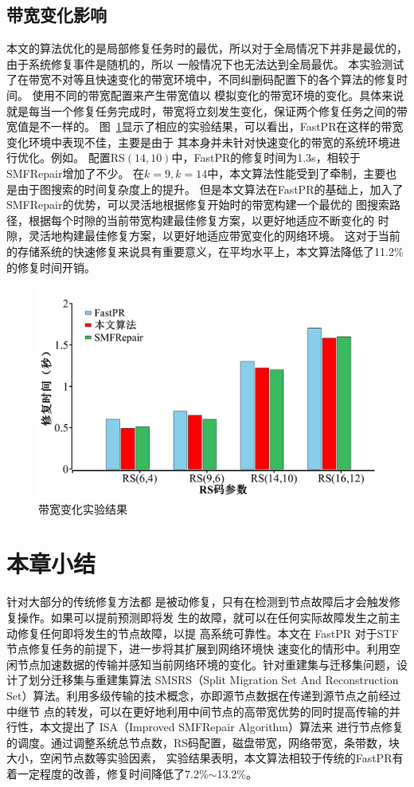 \subsection{带宽变化影响}
本文的算法优化的是局部修复任务时的最优，所以对于全局情况下并非是最优的，由于系统修复事件是随机的，所以
一般情况下也无法达到全局最优。
本实验测试了在带宽不对等且快速变化的带宽环境中，不同纠删码配置下的各个算法的修复时间。
使用不同的带宽配置来产生带宽值以
模拟变化的带宽环境的变化。具体来说就是每当一个修复任务完成时，带宽将立刻发生变化，保证两个修复任务之间的带宽值是不一样的。
图~\ref{fig:3-19}显示了相应的实验结果，可以看出，FastPR在这样的带宽变化环境中表现不佳，主要是由于
其本身并未针对快速变化的带宽的系统环境进行优化。例如。
配置RS$(14, 10)$中，FastPR的修复时间为1.3s，相较于SMFRepair增加了不少。
在$k=9,k=14$中，本文算法性能受到了牵制，主要也是由于图搜索的时间复杂度上的提升。
但是本文算法在FastPR的基础上，加入了SMFRepair的优势，可以灵活地根据修复开始时的带宽构建一个最优的
图搜索路径，根据每个时隙的当前带宽构建最佳修复方案，以更好地适应不断变化的
时隙，灵活地构建最佳修复方案，以更好地适应带宽变化的网络环境。
这对于当前的存储系统的快速修复来说具有重要意义，在平均水平上，本文算法降低了11.2\%的修复时间开销。

\begin{figure}[htbp]
	\centering
	\includegraphics [scale=0.25]{figures/3-19.pdf}
	\caption{带宽变化实验结果}
	\label{fig:3-19}
\end{figure}

\section{本章小结}
针对大部分的传统修复方法都
是被动修复，只有在检测到节点故障后才会触发修复操作。如果可以提前预测即将发
生的故障，就可以在任何实际故障发生之前主动修复任何即将发生的节点故障，以提
高系统可靠性。本文在 FastPR 对于STF节点修复任务的前提下，进一步将其扩展到网络环境快
速变化的情形中。利用空闲节点加速数据的传输并感知当前网络环境的变化。针对重建集与迁移集问题，设计了划分迁移集与重建集算法
SMSRS（Split Migration Set And Reconstruction Set）算法。利用多级传输的技术概念，亦即源节点数据在传递到源节点之前经过中继节
点的转发，可以在更好地利用中间节点的高带宽优势的同时提高传输的并行性，本文提出了 ISA（Improved SMFRepair Algorithm）算法来
进行节点修复的调度。通过调整系统总节点数，RS码配置，磁盘带宽，网络带宽，条带数，块大小，空闲节点数等实验因素，
实验结果表明，本文算法相较于传统的FastPR有着一定程度的改善，修复时间降低了7.2\%$\sim$13.2\%。
